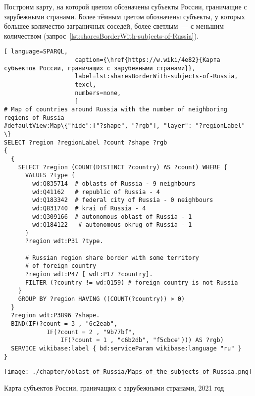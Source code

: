 \newpage
Построим карту, на которой цветом обозначены субъекты России, 
граничащие с зарубежными странами. 
Более тёмным цветом обозначены субъекты, у которых большее количество заграничных соседей, 
более светлым~--- с меньшим количеством (запрос~\ref{lst:sharesBorderWith-subjects-of-Russia}).

\lstset{numbers=left, firstnumber=1, frame=single}
\begin{lstlisting}[ language=SPARQL, 
                    caption={\href{https://w.wiki/4e82}{Карта субъектов России, граничащих с зарубежными странами}},
                    label=lst:sharesBorderWith-subjects-of-Russia,
                    texcl,
                    numbers=none,
                    ]
# Map of countries around Russia with the number of neighboring regions of Russia
#defaultView:Map\{"hide":["?shape", "?rgb"], "layer": "?regionLabel" \}
SELECT ?region ?regionLabel ?count ?shape ?rgb
{
  {
    SELECT ?region (COUNT(DISTINCT ?country) AS ?count) WHERE {
      VALUES ?type {
        wd:Q835714  # oblasts of Russia - 9 neighbours
        wd:Q41162   # republic of Russia - 4
        wd:Q183342  # federal city of Russia - 0 neighbours
        wd:Q831740  # krai of Russia - 4
        wd:Q309166  # autonomous oblast of Russia - 1
        wd:Q184122   # autonomous okrug of Russia - 1
      }
      ?region wdt:P31 ?type.
  
      # Russian region share border with some territory 
      # of foreign country
      ?region wdt:P47 [ wdt:P17 ?country].
      FILTER (?country != wd:Q159) # foreign country is not Russia
    }
    GROUP BY ?region HAVING ((COUNT(?country)) > 0)
  }
  ?region wdt:P3896 ?shape.
  BIND(IF(?count = 3 , "6c2eab", 
            IF(?count = 2 , "9b77bf", 
                IF(?count = 1 , "c6b2db", "f5cbce"))) AS ?rgb)
  SERVICE wikibase:label { bd:serviceParam wikibase:language "ru" }  
}
\end{lstlisting}%
\begin{marginfigure}[-42\baselineskip]
	\texttt{[image: ./chapter/oblast\_of\_Russia/Maps\_of\_the\_subjects\_of\_Russia.png]}
	\caption[Карта пограничных субъектов России, 2021 год.]{Карта субъектов России, 
            граничащих с зарубежными странами, 2021 год}%
      \label{fig:MapsharesBorderWithsubjectsofRussia}%
\end{marginfigure}

